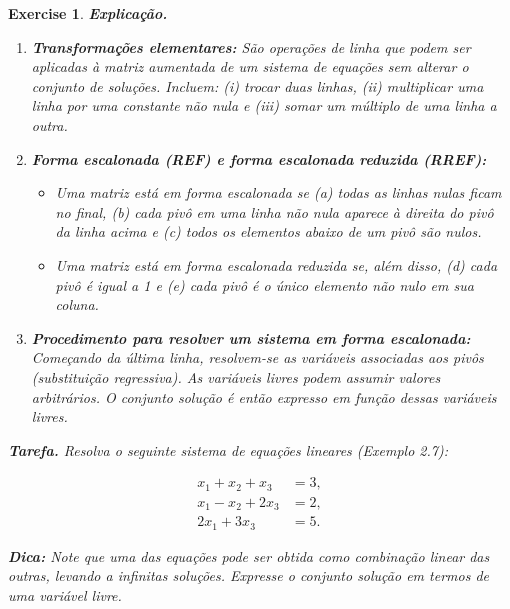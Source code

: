 \documentclass[12pt,a4paper]{article}
\newtheorem{exercise}{Exercise}[section]
\begin{document}
\begin{exercise}
\textbf{Explicação.} 

\begin{enumerate}
  \item \textbf{Transformações elementares:} São operações de linha que podem ser aplicadas à matriz aumentada de um sistema de equações sem alterar o conjunto de soluções. Incluem: (i) trocar duas linhas, (ii) multiplicar uma linha por uma constante não nula e (iii) somar um múltiplo de uma linha a outra.

  \item \textbf{Forma escalonada (REF) e forma escalonada reduzida (RREF):}
  \begin{itemize}
    \item Uma matriz está em \emph{forma escalonada} se (a) todas as linhas nulas ficam no final, (b) cada pivô em uma linha não nula aparece à direita do pivô da linha acima e (c) todos os elementos abaixo de um pivô são nulos.
    \item Uma matriz está em \emph{forma escalonada reduzida} se, além disso, (d) cada pivô é igual a 1 e (e) cada pivô é o único elemento não nulo em sua coluna.
  \end{itemize}

  \item \textbf{Procedimento para resolver um sistema em forma escalonada:} Começando da última linha, resolvem-se as variáveis associadas aos pivôs (substituição regressiva). As variáveis livres podem assumir valores arbitrários. O conjunto solução é então expresso em função dessas variáveis livres.
\end{enumerate}

\bigskip

\textbf{Tarefa.} Resolva o seguinte sistema de equações lineares (Exemplo 2.7):

\[
\begin{aligned}
x_1 + x_2 + x_3 &= 3, \\
x_1 - x_2 + 2x_3 &= 2, \\
2x_1 + 3x_3 &= 5.
\end{aligned}
\]

\textbf{Dica:} Note que uma das equações pode ser obtida como combinação linear das outras, levando a infinitas soluções. Expresse o conjunto solução em termos de uma variável livre.
\end{exercise}
\end{document}
